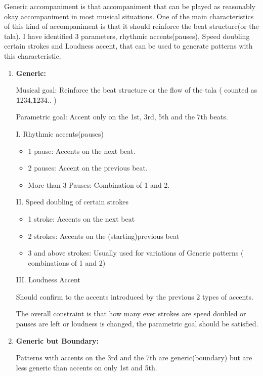 
Generic accompaniment is that accompaniment that can be played as reasonably okay accompaniment in most musical situations. One of the main characteristics of this kind of accompaniment is that it should reinforce the beat structure(or the tala). I have identified 3 parameters, rhythmic accents(pauses), Speed doubling certain strokes and Loudness accent, that can be used to generate patterns with this characteristic. 

\begin{enumerate}

\item \textbf{Generic:}

Musical goal: Reinforce the beat structure or the flow of the tala ( counted as \textbf{1}234,\textbf{1}234..  )

Parametric goal: Accent only on the 1st, 3rd, 5th and the 7th beats.

I. Rhythmic accents(pauses)

\begin{itemize}
\item 1 pause:  Accents on the next beat.
\item 2 pauses: Accent on the previous beat.
\item More than 3 Pauses: Combination of 1 and 2.
\end{itemize}

II. Speed doubling of certain strokes

\begin{itemize}
\item 1 stroke: Accents on the next beat
\item 2 strokes: Accents on the (starting)previous beat
\item 3 and above strokes: Usually used for variations of Generic patterns ( combinations of 1 and 2)
\end{itemize}

III. Loudness Accent

Should confirm to the accents introduced by the previous 2 types of accents.

The overall constraint is that how many ever strokes are speed doubled or pauses are left or loudness is changed, the parametric goal should be satisfied. 

\item \textbf{Generic but Boundary:}

Patterns with accents on the 3rd and the 7th are generic(boundary) but are less generic than accents on only 1st and 5th.


\end{enumerate}
